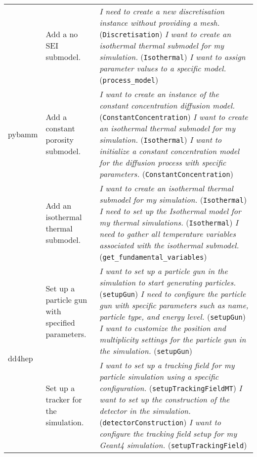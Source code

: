 \begin{longtable}{p{3cm}p{6cm}p{6cm}}
\multirow{3}{*}{pybamm} & Add a no SEI submodel. & \textit{I need to create a new discretisation instance without providing a mesh.} (\texttt{Discretisation}) \newline \textit{I want to create an isothermal thermal submodel for my simulation.} (\texttt{Isothermal}) \newline \textit{I want to assign parameter values to a specific model.} (\texttt{process\_model}) \\
\cmidrule(l){2-3}
& Add a constant porosity submodel. & \textit{I want to create an instance of the constant concentration diffusion model.} (\texttt{ConstantConcentration}) \newline \textit{I want to create an isothermal thermal submodel for my simulation.} (\texttt{Isothermal}) \newline \textit{I want to initialize a constant concentration model for the diffusion process with specific parameters.} (\texttt{ConstantConcentration}) \\
\cmidrule(l){2-3}
& Add an isothermal thermal submodel. & \textit{I want to create an isothermal thermal submodel for my simulation.} (\texttt{Isothermal}) \newline \textit{I need to set up the Isothermal model for my thermal simulations.} (\texttt{Isothermal}) \newline \textit{I need to gather all temperature variables associated with the isothermal submodel.} (\texttt{get\_fundamental\_variables}) \\
\midrule
\multirow{3}{*}{dd4hep} & Set up a particle gun with specified parameters. & \textit{I want to set up a particle gun in the simulation to start generating particles.} (\texttt{setupGun}) \newline \textit{I need to configure the particle gun with specific parameters such as name, particle type, and energy level.} (\texttt{setupGun}) \newline \textit{I want to customize the position and multiplicity settings for the particle gun in the simulation.} (\texttt{setupGun}) \\
\cmidrule(l){2-3}
& Set up a tracker for the simulation. & \textit{I want to set up a tracking field for my particle simulation using a specific configuration.} (\texttt{setupTrackingFieldMT}) \newline \textit{I want to set up the construction of the detector in the simulation.} (\texttt{detectorConstruction}) \newline \textit{I want to configure the tracking field setup for my Geant4 simulation.} (\texttt{setupTrackingField}) \\

\end{longtable}
